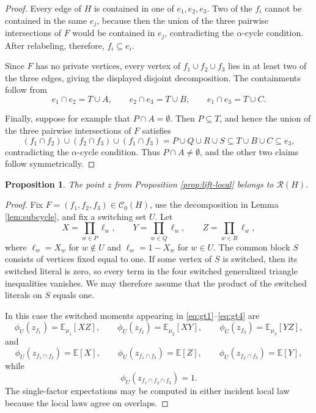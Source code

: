 \documentclass[11pt]{article}
\newtheorem{proposition}[theorem]{Proposition}
\theoremstyle{definition}
\theoremstyle{remark}
\newcommand{\Rall}{\mathcal{R}}
\newcommand{\E}{\mathbb{E}}
\begin{document}
\begin{editedaiblock}
\begin{proof}
Every edge of $H$ is contained in one of $e_1,e_2,e_3$. Two of the $f_i$ cannot be contained in the same $e_j$, because then the union of the three pairwise intersections of $F$ would be contained in $e_j$, contradicting the $\alpha$-cycle condition. After relabeling, therefore, $f_i\subseteq e_i$.

Since $F$ has no private vertices, every vertex of $f_1\cup f_2\cup f_3$ lies in at least two of the three edges, giving the displayed disjoint decomposition. The containments follow from
\[
e_1\cap e_2=T\cup A,\qquad e_2\cap e_3=T\cup B,\qquad e_1\cap e_3=T\cup C.
\]

Finally, suppose for example that $P\cap A=\emptyset$. Then $P\subseteq T$, and hence the union of the three pairwise intersections of $F$ satisfies
\[
(f_1\cap f_2)\cup(f_2\cap f_3)\cup(f_1\cap f_3)
=P\cup Q\cup R\cup S
\subseteq T\cup B\cup C
\subseteq e_3,
\]
contradicting the $\alpha$-cycle condition. Thus $P\cap A\neq\emptyset$, and the other two claims follow symmetrically.
\end{proof}

\begin{proposition}\label{prop:all-cycles}
The point $z$ from Proposition \ref{prop:lift-local} belongs to $\Rall(H)$.
\end{proposition}

\begin{proof}
Fix $F=(f_1,f_2,f_3)\in\mathcal C_0(H)$, use the decomposition in Lemma \ref{lem:subcycle}, and fix a switching set $U$. Let
\[
X=\prod_{w\in P}\ell_w,\qquad
Y=\prod_{w\in Q}\ell_w,\qquad
Z=\prod_{w\in R}\ell_w,
\]
where $\ell_w=X_w$ for $w\notin U$ and $\ell_w=1-X_w$ for $w\in U$. The common block $S$ consists of vertices fixed equal to one. If some vertex of $S$ is switched, then its switched literal is zero, so every term in the four switched generalized triangle inequalities vanishes. We may therefore assume that the product of the switched literals on $S$ equals one.


In this case the switched moments appearing in \eqref{eq:gt1}--\eqref{eq:gt4} are
\[
\phi_U(z_{f_1})=\E_{\mu_1}[XZ],\qquad
\phi_U(z_{f_2})=\E_{\mu_2}[XY],\qquad
\phi_U(z_{f_3})=\E_{\mu_3}[YZ],
\]
and
\[
\phi_U(z_{f_1\cap f_2})=\E[X],\qquad
\phi_U(z_{f_1\cap f_3})=\E[Z],\qquad
\phi_U(z_{f_2\cap f_3})=\E[Y],
\]
while
\[
\phi_U(z_{f_1\cap f_2\cap f_3})=1.
\]
The single-factor expectations may be computed in either incident local law because the local laws agree on overlaps.


\end{proof}
\end{editedaiblock}
\end{document}

